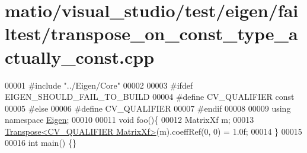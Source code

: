 \hypertarget{matio_2visual__studio_2test_2eigen_2failtest_2transpose__on__const__type__actually__const_8cpp_source}{}\section{matio/visual\+\_\+studio/test/eigen/failtest/transpose\+\_\+on\+\_\+const\+\_\+type\+\_\+actually\+\_\+const.cpp}
\label{matio_2visual__studio_2test_2eigen_2failtest_2transpose__on__const__type__actually__const_8cpp_source}

\begin{DoxyCode}
00001 \textcolor{preprocessor}{#include "../Eigen/Core"}
00002 
00003 \textcolor{preprocessor}{#ifdef EIGEN\_SHOULD\_FAIL\_TO\_BUILD}
00004 \textcolor{preprocessor}{#define CV\_QUALIFIER const}
00005 \textcolor{preprocessor}{#else}
00006 \textcolor{preprocessor}{#define CV\_QUALIFIER}
00007 \textcolor{preprocessor}{#endif}
00008 
00009 \textcolor{keyword}{using namespace }\hyperlink{namespace_eigen}{Eigen};
00010 
00011 \textcolor{keywordtype}{void} foo()\{
00012     MatrixXf m;
00013     \hyperlink{group___core___module_class_eigen_1_1_transpose}{Transpose<CV\_QUALIFIER MatrixXf>}(m).coeffRef(0, 0) = 1.0f;
00014 \}
00015 
00016 \textcolor{keywordtype}{int} main() \{\}
\end{DoxyCode}
